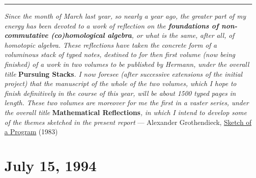 \documentclass{article}
\renewcommand{\texttt}[1]{%
  \begingroup
  \ttfamily
  \begingroup\lccode`~=`/\lowercase{\endgroup\def~}{/\discretionary{}{}{}}%
  \begingroup\lccode`~=`[\lowercase{\endgroup\def~}{[\discretionary{}{}{}}%
  \begingroup\lccode`~=`.\lowercase{\endgroup\def~}{.\discretionary{}{}{}}%
  \catcode`/=\active\catcode`[=\active\catcode`.=\active
  \scantokens{#1\noexpand}%
  \endgroup
}
\begin{document}

\begin{center}\rule{0.5\linewidth}{0.5pt}\end{center}

\emph{Since the month of March last year, so nearly a year ago, the
greater part of my energy has been devoted to a work of reflection on
the \textbf{foundations of non-commutative (co)homological algebra}, or
what is the same, after all, of homotopic algebra. These reflections
have taken the concrete form of a voluminous stack of typed notes,
destined to for then first volume (now being finished) of a work in two
volumes to be published by Hermann, under the overall title}
\textbf{Pursuing Stacks}\emph{. I now foresee (after successive
extensions of the initial project) that the manuscript of the whole of
the two volumes, which I hope to finish definitively in the course of
this year, will be about 1500 typed pages in length. These two volumes
are moreover for me the first in a vaster series, under the overall
title} \textbf{Mathematical Reflections}\emph{, in which I intend to
develop some of the themes sketched in the present report} --- Alexander
Grothendieck, \href{http://www.grothendieckcircle.org/}{Sketch of a
Program} (1983)
\hypertarget{week36}{%
\section{July 15, 1994}\label{week36}}
\end{document}
